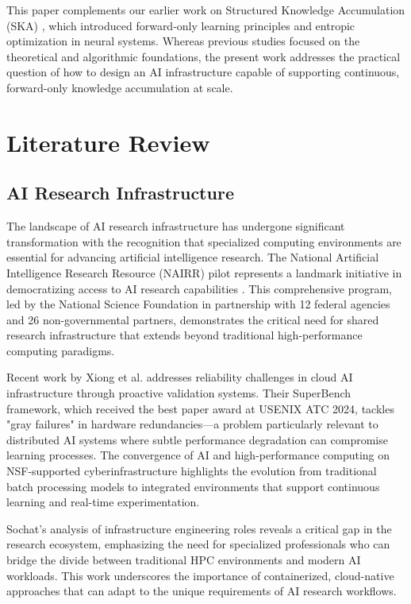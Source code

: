\documentclass[11pt]{article}
\begin{document}
	
	This paper complements our earlier work on Structured Knowledge Accumulation (SKA) \cite{ska2025a} \cite{ska2025b}, which introduced forward-only learning principles and entropic optimization in neural systems. Whereas previous studies focused on the theoretical and algorithmic foundations, the present work addresses the practical question of how to design an AI infrastructure capable of supporting continuous, forward-only knowledge accumulation at scale.
	
	\section{Literature Review}
	\label{sec:literature}
	
	\subsection{AI Research Infrastructure}
	The landscape of AI research infrastructure has undergone significant transformation with the recognition that specialized computing environments are essential for advancing artificial intelligence research. The National Artificial Intelligence Research Resource (NAIRR) pilot represents a landmark initiative in democratizing access to AI research capabilities \cite{nairr2024}. This comprehensive program, led by the National Science Foundation in partnership with 12 federal agencies and 26 non-governmental partners, demonstrates the critical need for shared research infrastructure that extends beyond traditional high-performance computing paradigms.
	
	Recent work by Xiong et al. \cite{superbench2024} addresses reliability challenges in cloud AI infrastructure through proactive validation systems. Their SuperBench framework, which received the best paper award at USENIX ATC 2024, tackles "gray failures" in hardware redundancies—a problem particularly relevant to distributed AI systems where subtle performance degradation can compromise learning processes. The convergence of AI and high-performance computing on NSF-supported cyberinfrastructure \cite{aiconvergence2020} highlights the evolution from traditional batch processing models to integrated environments that support continuous learning and real-time experimentation.
	
	Sochat's analysis of infrastructure engineering roles \cite{infraengineering2024} reveals a critical gap in the research ecosystem, emphasizing the need for specialized professionals who can bridge the divide between traditional HPC environments and modern AI workloads. This work underscores the importance of containerized, cloud-native approaches that can adapt to the unique requirements of AI research workflows.
	
\end{document}
